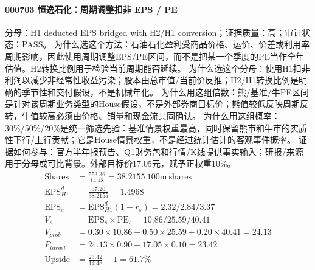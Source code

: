 \paragraph{000703 恒逸石化：周期调整扣非 EPS / PE}
分母：H1 deducted EPS bridged with H2/H1 conversion；证据质量：高；审计状态：PASS。
为什么选这个方法：石油石化盈利受商品价格、运价、价差或利用率周期影响，因此使用周期调整EPS/PE区间，而不是把某一个季度的PE当作全年估值。H2转换比例用于检验当前周期能否延续。
为什么选这个分母：使用H1扣非利润以减少非经常性收益污染；股本由总市值/当前价反推；H2/H1转换比例是明确的季节性和交付假设，不是机械年化。
为什么用这组倍数：熊/基准/牛PE区间是针对该周期业务类型的House假设，不是外部券商目标价；熊值较低反映周期反转，牛值较高必须由价格、销量和现金流共同确认。
为什么用这组概率：30\%/50\%/20\%是统一筛选先验：基准情景权重最高，同时保留熊市和牛市的实质性下行/上行贡献；它是House情景权重，不是经过统计估计的客观事件概率。
证据如何参与：官方半年报预告、Q1财务包和行情/K线提供事实输入；研报/来源用于分母或可比背景。外部目标价17.05元，赋予正权重10\%。
\begin{align*}
\mathrm{Shares} &= \frac{553.36}{14.48}=38.2155\ \mathrm{100m\ shares}\\
\mathrm{EPS}_{H1}^d &= \frac{57.20}{38.2155}=1.4968\\
\mathrm{EPS}_s &= \mathrm{EPS}_{H1}^d(1+r_s)=2.32/2.84/3.37\\
V_s &= \mathrm{EPS}_s\times \mathrm{PE}_s=10.86/25.59/40.41\\
V_{prob} &= 0.30\times 10.86+0.50\times 25.59+0.20\times 40.41=24.13\\
P_{target} &= 24.13\times 0.90+17.05\times 0.10=23.42\\
\mathrm{Upside} &= \frac{23.42}{14.48}-1=61.7\%\\
\end{align*}

